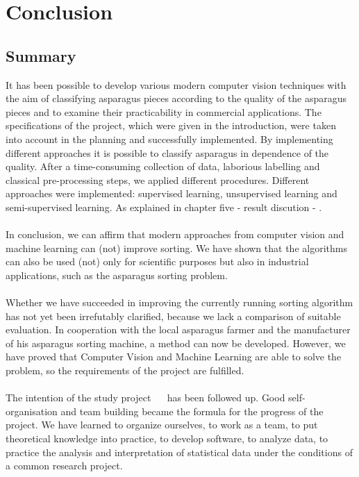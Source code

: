\section{Conclusion}


\subsection{Summary}

It has been possible to develop various modern computer vision techniques with the aim of classifying asparagus pieces according to the quality of the asparagus pieces and to examine their practicability in commercial applications. The specifications of the project, which were given in the introduction, were taken into account in the planning and successfully implemented. By implementing different approaches it is possible to classify asparagus in dependence of the quality. After a time-consuming collection of data, laborious labelling and classical pre-processing steps, we applied different procedures. Different approaches were implemented: supervised learning, unsupervised learning and semi-supervised learning. As explained in chapter five - result discution - . \\
\\
In conclusion, we can affirm that modern approaches from computer vision and machine learning can (not) improve sorting. We have shown that the algorithms can also be used (not) only for scientific purposes but also in industrial applications, such as the asparagus sorting problem. \\
\\
Whether we have succeeded in improving the currently running sorting algorithm has not yet been irrefutably clarified, because we lack a comparison of suitable evaluation. In cooperation with the local asparagus farmer and the manufacturer of his asparagus sorting machine, a method can now be developed. However, we have proved that Computer Vision and Machine Learning are able to solve the problem, so the requirements of the project are fulfilled. \\
\\
The intention of the study project ~\citep{ studyregulations}~\citep{moduledescription} has been followed up. Good self-organisation and team building became the formula for the progress of the project. We have learned to organize ourselves, to work as a team, to put theoretical knowledge into practice, to develop software, to analyze data, to practice the analysis and interpretation of statistical data under the conditions of a common research project.


